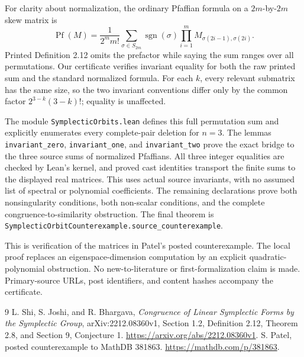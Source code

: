 \documentclass[11pt]{article}
\newcommand{\Pf}{\operatorname{Pf}}
\begin{document}
For clarity about normalization, the ordinary Pfaffian formula on a $2m$-by-$2m$ skew matrix is
\[
 \Pf(M)=\frac1{2^m m!}\sum_{\sigma\in S_{2m}}\operatorname{sgn}(\sigma)
       \prod_{i=1}^m M_{\sigma(2i-1),\sigma(2i)}.
\]
Printed Definition 2.12 omits the prefactor while saying the sum ranges over all permutations. Our certificate verifies invariant equality for both the raw printed sum and the standard normalized formula. For each $k$, every relevant submatrix has the same size, so the two invariant conventions differ only by the common factor $2^{3-k}(3-k)!$; equality is unaffected.

The module \texttt{SymplecticOrbits.lean} defines this full permutation sum and explicitly enumerates every complete-pair deletion for $n=3$. The lemmas \texttt{invariant\_zero}, \texttt{invariant\_one}, and \texttt{invariant\_two} prove the exact bridge to the three source sums of normalized Pfaffians. All three integer equalities are checked by Lean's kernel, and proved cast identities transport the finite sums to the displayed real matrices. This uses actual source invariants, with no assumed list of spectral or polynomial coefficients. The remaining declarations prove both nonsingularity conditions, both non-scalar conditions, and the complete congruence-to-similarity obstruction. The final theorem is \texttt{SymplecticOrbitCounterexample.source\_counterexample}.

This is verification of the matrices in Patel's posted counterexample. The local proof replaces an eigenspace-dimension computation by an explicit quadratic-polynomial obstruction. No new-to-literature or first-formalization claim is made. Primary-source URLs, post identifiers, and content hashes accompany the certificate.
\begin{thebibliography}{9}
 L. Shi, S. Joshi, and R. Bhargava, \emph{Congruence of Linear Symplectic Forms by the Symplectic Group}, arXiv:2212.08360v1, Section 1.2, Definition 2.12, Theorem 2.8, and Section 9, Conjecture 1. \url{https://arxiv.org/abs/2212.08360v1}.
 S. Patel, posted counterexample to MathDB 381863. \url{https://mathdb.com/p/381863}.
\end{thebibliography}
\end{document}

